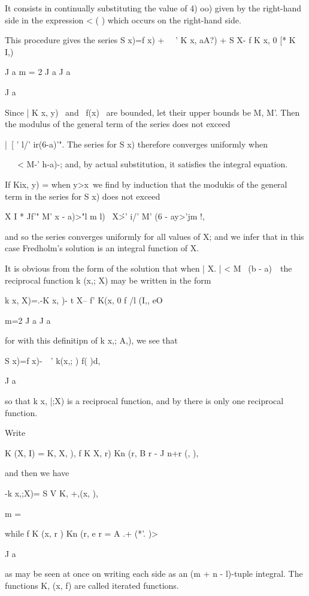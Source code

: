 {%
%

It consists in continually substituting the value of 4) oo) given by
the right-hand side in the expression < ( ) which occurs on the
right-hand side.

This procedure gives the series S x)=f x) + \ \ ' K x, aA?) + S X- f K
x, 0 [* K I,)

J a m = 2 J a J a

J a

Since | K x, y) \ and \ f(x) \ are bounded, let their upper bounds be
M, M'. Then the modulus of the general term of the series does not
exceed

|\ [ ' l/' ir(6-a)'". The series for S x) therefore converges
uniformly when

\ \ \ < M-' h-a)-; and, by actual substitution, it satisfies the
integral equation.

If Kix, y) = when y>x\ we find by induction that the modukis of the
general term in the series for S x) does not exceed

X I * Jf'" M' x - a)>"l m l) \ X\'>' i/' M' (6 - ay>'jm !,

and so the series converges uniformly for all values of X; and we
infer that in this case Fredholm's solution is an integral function of
X.

It is obvious from the form of the solution that when | X. | < M~ (b -
a)~\ the reciprocal function k (x,; X) may be written in the form

k x, X)=.-K x, )- t X-- f' K(x, 0 f /l (I,, eO

m=2 J a J a

for with this definitipn of k x,; A,), we see that

S x)=f x)-\ \ ' k(x,; ) f( )d,

J a

so that k x, |;X) is a reciprocal function, and by there is
only one reciprocal function.

Write

K (X, I) = K, X, ), f K X, r) Kn (r, B r - J n+r (, ),

and then we have

-k x,;X)= S V K, +,(x, ),

m =

while f K (x, r ) Kn (r, e r = A .+ (*'. )>

J a

as may be seen at once on writing each side as an (m + n - l)-tuple
integral. The functions K, (x, f) are called iterated functions.

}
